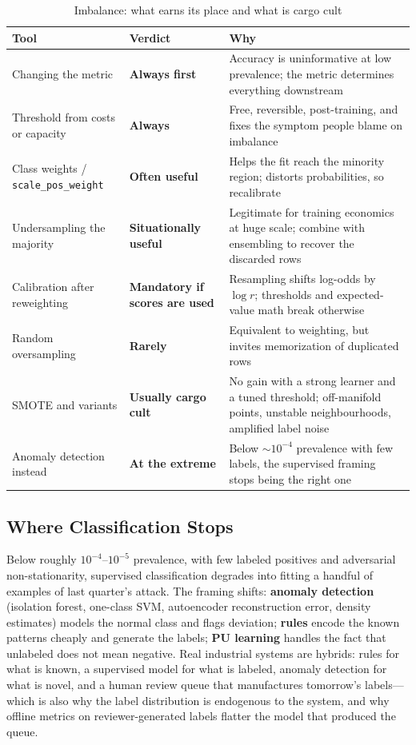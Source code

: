 \begin{table}[H]
\centering
\small
\caption{Imbalance: what earns its place and what is cargo cult}
\label{cml:tab:imbalance_tools}
\begin{tabularx}{\textwidth}{lXX}
\toprule
\textbf{Tool} & \textbf{Verdict} & \textbf{Why} \\
\midrule
Changing the metric & \textbf{Always first} & Accuracy is uninformative at low prevalence; the metric determines everything downstream \\
Threshold from costs or capacity & \textbf{Always} & Free, reversible, post-training, and fixes the symptom people blame on imbalance \\
Class weights / \texttt{scale\_pos\_weight} & \textbf{Often useful} & Helps the fit reach the minority region; distorts probabilities, so recalibrate \\
Undersampling the majority & \textbf{Situationally useful} & Legitimate for training economics at huge scale; combine with ensembling to recover the discarded rows \\
Calibration after reweighting & \textbf{Mandatory if scores are used} & Resampling shifts log-odds by $\log r$; thresholds and expected-value math break otherwise \\
Random oversampling & \textbf{Rarely} & Equivalent to weighting, but invites memorization of duplicated rows \\
SMOTE and variants & \textbf{Usually cargo cult} & No gain with a strong learner and a tuned threshold; off-manifold points, unstable neighbourhoods, amplified label noise \\
Anomaly detection instead & \textbf{At the extreme} & Below $\sim10^{-4}$ prevalence with few labels, the supervised framing stops being the right one \\
\bottomrule
\end{tabularx}
\end{table}

\subsection{Where Classification Stops}

Below roughly $10^{-4}$--$10^{-5}$ prevalence, with few labeled positives and adversarial non-stationarity, supervised classification degrades into fitting a handful of examples of last quarter's attack. The framing shifts: \textbf{anomaly detection} (isolation forest, one-class SVM, autoencoder reconstruction error, density estimates) models the normal class and flags deviation; \textbf{rules} encode the known patterns cheaply and generate the labels; \textbf{PU learning} handles the fact that unlabeled does not mean negative. Real industrial systems are hybrids: rules for what is known, a supervised model for what is labeled, anomaly detection for what is novel, and a human review queue that manufactures tomorrow's labels---which is also why the label distribution is endogenous to the system, and why offline metrics on reviewer-generated labels flatter the model that produced the queue.

